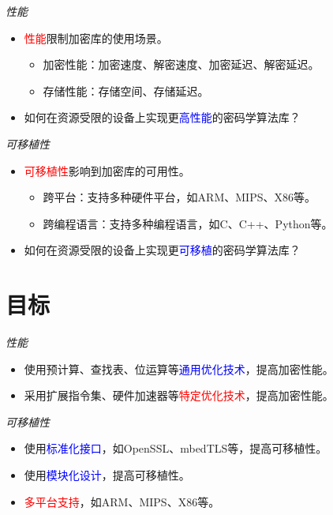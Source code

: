\documentclass{beamer}
\begin{document}
\begin{frame}{\textit{性能}}
    \begin{itemize}
        \item \textcolor{red}{性能}限制加密库的使用场景。
              \begin{itemize}
                  \item 加密性能：加密速度、解密速度、加密延迟、解密延迟。
                  \item 存储性能：存储空间、存储延迟。
              \end{itemize}
        \item 如何在资源受限的设备上实现更\textcolor{blue}{高性能}的密码学算法库？
    \end{itemize}
\end{frame}

\begin{frame}{\textit{可移植性}}
    \begin{itemize}
        \item \textcolor{red}{可移植性}影响到加密库的可用性。
              \begin{itemize}
                  \item 跨平台：支持多种硬件平台，如ARM、MIPS、X86等。
                  \item 跨编程语言：支持多种编程语言，如C、C++、Python等。
              \end{itemize}
        \item 如何在资源受限的设备上实现更\textcolor{blue}{可移植}的密码学算法库？
    \end{itemize}
\end{frame}

\section{目标}

\begin{frame}{\textit{性能}}
    \begin{itemize}
        \item 使用预计算、查找表、位运算等\textcolor{blue}{通用优化技术}，提高加密性能。
        \item 采用扩展指令集、硬件加速器等\textcolor{red}{特定优化技术}，提高加密性能。
    \end{itemize}
\end{frame}

\begin{frame}{\textit{可移植性}}
    \begin{itemize}
        \item 使用\textcolor{blue}{标准化接口}，如OpenSSL、mbedTLS等，提高可移植性。
        \item 使用\textcolor{blue}{模块化设计}，提高可移植性。
        \item \textcolor{red}{多平台支持}，如ARM、MIPS、X86等。
    \end{itemize}
\end{frame}
\end{document}
